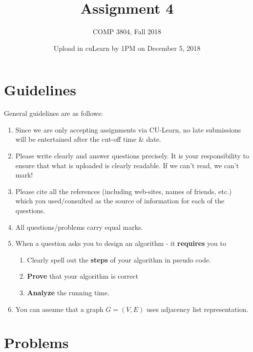 \documentclass[12pt]{article}
\title{Assignment 4}
\author{COMP 3804, Fall 2018}
\date{Upload in cuLearn by 1PM on December 5, 2018}
\begin{document}
\maketitle

\section{Guidelines}
General guidelines are as follows:
 
\begin{enumerate}
\item Since we are only accepting assignments via CU-Learn, no late submissions will be entertained after the cut-off time \& date. 

\item Please write clearly and answer questions precisely.  It is your responsibility to ensure that what is uploaded is clearly readable. If we can't read, we can't mark!


\item Please cite all the references (including web-sites, names of friends,
etc.) which you used/consulted as the source of information for each of
the questions. 


\item All questions/problems carry equal marks. 

\item When a question asks you to design an algorithm - it {\bf requires} you to 
\begin{enumerate}
\item Clearly spell out the {\bf steps}  of your algorithm in pseudo code.
\item {\bf Prove} that your algorithm is correct 
\item {\bf Analyze} the running time. 
\end{enumerate}

\item You can assume that a graph  $G=(V,E)$ uses adjacency list representation. 

\end{enumerate}



\section{Problems}
\end{document}
